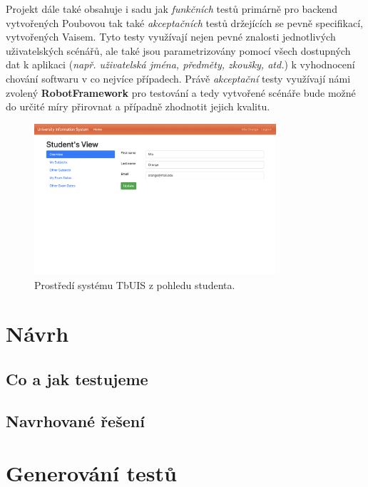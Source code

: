 \documentclass[czech, ma, kiv, he, iso690alph, pdf, viewonly]{fasthesis}
\begin{document}
    Projekt dále také obsahuje i sadu jak \textit{funkčních} testů primárně pro backend vytvořených Poubovou tak také \textit{akceptačních} testů držejících se pevně specifikací, vytvořených Vaisem. \cite{Poubova2019} \cite{Vais2020} Tyto testy využívají nejen pevné znalosti jednotlivých uživatelských scénářů, ale také jsou parametrizovány pomocí všech dostupných dat k aplikaci (\textit{např. uživatelská jména, předměty, zkoušky, atd.}) k vyhodnocení chování softwaru v co nejvíce případech. Právě \textit{akceptační} testy využívají námi zvolený \textbf{RobotFramework} pro testování a tedy vytvořené scénáře bude možné do určité míry přirovnat a případně zhodnotit jejich kvalitu. 

    \begin{figure}
        \includegraphics[width=0.8\textwidth]{pic/tbuis.png}
        \centering
        \caption{Prostředí systému TbUIS z pohledu studenta.}
        \label{fig:tbuis}
    \end{figure}

\chapter{Návrh}

        \section{Co a jak testujeme}

        \section{Navrhované řešení}


\chapter{Generování testů} \label{sec:test_generation}
\end{document}
